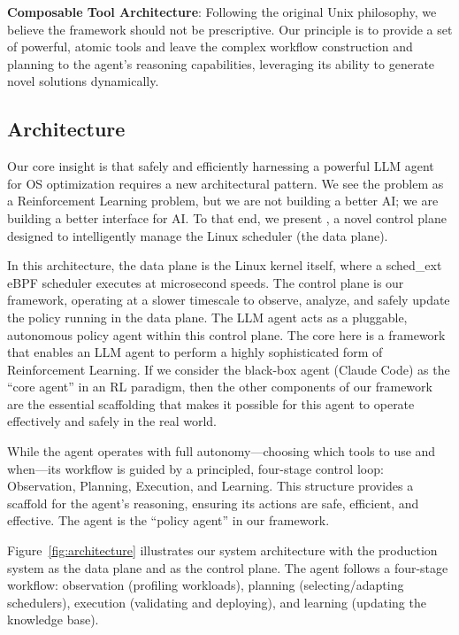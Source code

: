 \textbf{Composable Tool Architecture}: Following the original Unix philosophy, we believe the framework should not be prescriptive. Our principle is to provide a set of powerful, atomic tools and leave the complex workflow construction and planning to the agent's reasoning capabilities, leveraging its ability to generate novel solutions dynamically.

\subsection{\sys  Architecture}

Our core insight is that safely and efficiently harnessing a powerful LLM agent for OS optimization requires a new architectural pattern. We see the problem as a Reinforcement Learning problem, but we are not building a better AI; we are building a better interface for AI. To that end, we present \sys, a novel control plane designed to intelligently manage the Linux scheduler (the data plane).

In this architecture, the data plane is the Linux kernel itself, where a sched\_ext eBPF scheduler executes at microsecond speeds. The control plane is our framework, operating at a slower timescale to observe, analyze, and safely update the policy running in the data plane. The LLM agent acts as a pluggable, autonomous policy agent within this control plane. The core here is a framework that enables an LLM agent to perform a highly sophisticated form of Reinforcement Learning. If we consider the black-box agent (Claude Code) as the ``core agent'' in an RL paradigm, then the other components of our framework are the essential scaffolding that makes it possible for this agent to operate effectively and safely in the real world.

While the agent operates with full autonomy—choosing which tools to use and when—its workflow is guided by a principled, four-stage control loop: Observation, Planning, Execution, and Learning. This structure provides a scaffold for the agent's reasoning, ensuring its actions are safe, efficient, and effective. The agent is the ``policy agent'' in our framework.

Figure~\ref{fig:architecture} illustrates our system architecture with the production system as the data plane and \sys as the control plane. The agent follows a four-stage workflow: observation (profiling workloads), planning (selecting/adapting schedulers), execution (validating and deploying), and learning (updating the knowledge base).

